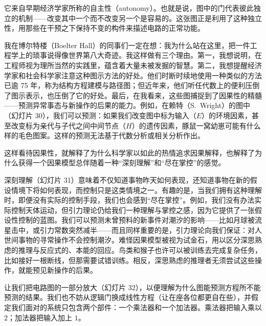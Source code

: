它来自早期经济学家所称的自主性（autonomy）。也就是说，图中的门代表彼此独立的机制——改变其中一个而不改变另一个是容易的。这张图正是利用了这种独立性，用那些在干预之下保持不变的构件来描述电路的正常功能。

我在博尔特楼（Boelter Hall）的同事们一定在想：我为什么站在这里，把一件工程学上的琐事说得像世界第八大奇迹。我这样做有三个理由。第一，我想说明，在工程师视为理所当然的实践里，蕴含着大量未被发掘的智慧。第二，我想提醒经济学家和社会科学家注意这种图示方法的好处。他们时断时续地使用一种类似的方法已逾 75 年，称为结构方程建模与路径图；但近年来，他们听任代数上的便利压倒了图示表示，也压倒了它的好处。最后，在我看来，这些图捕捉到了因果性的精髓——预测异常事态与新操作的后果的能力。例如，在赖特（S.~Wright）的图中（幻灯片 30），我们可以预测：如果我们改变图中标为输入（$E$）的环境因素，甚至改变标为亲代与子代之间中间节点（$H$）的遗传因素，豚鼠一窝幼崽可能有什么样的毛色图案。这样的预测无法基于代数分析或相关分析作出。

\begin{center}
\end{center}

这样看待因果性，就解释了为什么科学家以如此的热情追求因果解释，也解释了为什么获得一个因果模型总伴随着一种“深刻理解”和“尽在掌控”的感觉。

深刻理解（幻灯片 31）意味着不仅知道事物昨天如何表现，还知道事物在新的假设情境下将如何表现，而控制只是这类情境之一。有趣的是，当我们拥有这种理解时，即便没有实际的控制手段，我们也会感到“尽在掌控”。例如，我们没有办法实际控制天体运动，但引力理论仍给我们一种理解与掌控之感，因为它提供了一张假设性控制的蓝图。我们可以预测未曾预料的新事件对潮汐的影响——比如月球被流星击中，或引力常数突然减半——而且同样重要的是，引力理论向我们保证：对人世间事物的寻常操作不会控制潮汐。难怪因果模型被视为试金石，用以区分深思熟虑的推理与反应式的、本能的回应。鸟类和猴子也许可以被训练去完成复杂任务，比如接好一根断线，但那需要试错训练。相反，深思熟虑的推理者无须尝试这些操作，就能预见新操作的后果。

让我们把电路图的一部分放大（幻灯片 32），以便理解为什么图能预测方程所不能预测的结果。我们也不妨从逻辑门换成线性方程（让在座各位都更自在些），并假定我们面对的系统只包含两个部件：一个乘法器和一个加法器。乘法器把输入乘以 $2$；加法器把输入加上 $1$。

